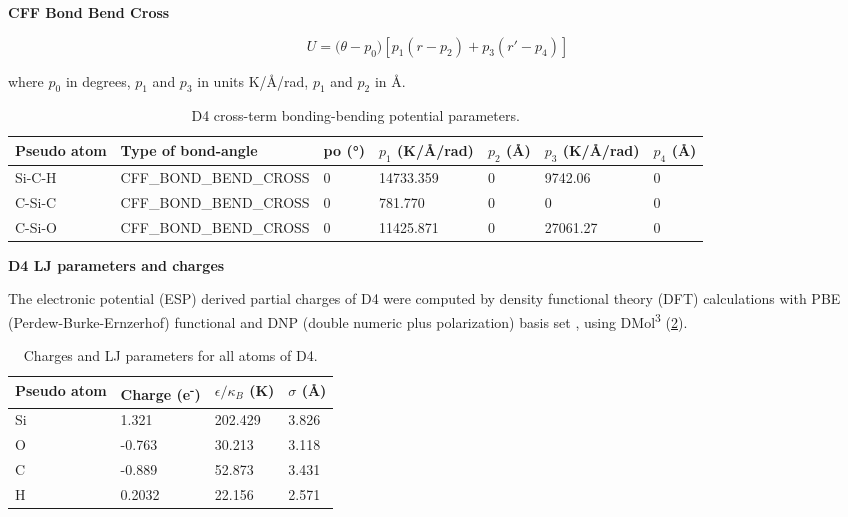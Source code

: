 \pagebreak

\textbf{CFF Bond Bend Cross}

\begin{equation}
    U = {(\theta - p}_{0}) [p_{1}(r - p_{2}) + p_{3}(r\prime - p_{4})]
\end{equation}

where \(p_0\) in degrees, \(p_1\) and \(p_3\) in units K/Å/rad, \(p_1\) and \(p_2\) in Å.

\begin{table}[H]
    \centering
    \caption{%
        D4 cross-term bonding-bending potential parameters.
    }\label{tbl:ff-d4-cross-bondbend}
    \begin{tabular}{@{}lllllll@{}}
        Pseudo atom & Type of bond-angle & po (°) & \(p_1\) (K/Å/rad) & \(p_2\) (Å) & \(p_3\) (K/Å/rad) & \(p_4\) (Å) \\
        \midrule
        Si-C-H & CFF\_BOND\_BEND\_CROSS & 0 & 14733.359 & 0 & 9742.06 & 0\\
        C-Si-C & CFF\_BOND\_BEND\_CROSS & 0 & 781.770 & 0 & 0 & 0\\
        C-Si-O & CFF\_BOND\_BEND\_CROSS & 0 & 11425.871 & 0 & 27061.27 & 0\\
        \bottomrule
    \end{tabular}
\end{table}

\textbf{D4 LJ parameters and charges}

The electronic potential (ESP) derived partial charges of D4 were computed by
density functional theory (DFT) calculations with PBE (Perdew-Burke-Ernzerhof)
functional \citep{perdewGeneralizedGradientApproximation1996} and DNP (double
numeric plus polarization) basis set
\citep{hehreSelfconsistentMolecularOrbital1972}, using DMol\textsuperscript{3}
\citep{delleyAllElectronNumerical1990} (\cref{tbl:ff-d4-charge}).

\begin{table}[H]
    \centering
    \caption{%
        Charges and LJ parameters for all atoms of D4.
    }\label{tbl:ff-d4-charge}
    \begin{tabular}{@{}llll@{}}
        Pseudo atom & Charge (e\textsuperscript{-}) & \(\epsilon / \kappa_B\) (K) & \(\sigma\) (Å) \\
        \midrule
        Si & 1.321 & 202.429 & 3.826\\
        O & -0.763 & 30.213 & 3.118\\
        C & -0.889 & 52.873 & 3.431\\
        H & 0.2032 & 22.156 & 2.571\\
        \bottomrule
    \end{tabular}
\end{table}


